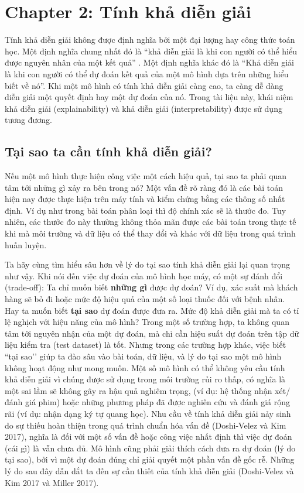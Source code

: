 \chapter*{Chapter 2: Tính khả diễn giải}
Tính khả diễn giải không được định nghĩa bởi một đại lượng hay công thức toán học. Một định nghĩa chung nhất đó là ``khả diễn giải là khi con người có thể hiểu được nguyên nhân của một kết quả'' . Một định nghĩa khác đó là ``Khả diễn giải là khi con người có thể dự đoán kết quả của một mô hình dựa trên những hiểu biết về nó''. Khi một mô hình có tính khả diễn giải càng cao, ta càng dễ dàng diễn giải một quyết định hay một dự đoán của nó. Trong tài liệu này, khái niệm khả diễn giải (explainability) và khả diễn giải (interpretability) được sử dụng tương đương.

\clearpage

\section{Tại sao ta cần tính khả diễn giải?}
Nếu một mô hình thực hiện công việc một cách hiệu quả, tại sao ta phải quan tâm tới những gì xảy ra bên trong nó? Một vấn đề rõ ràng đó là các bài toán hiện nay được thực hiện trên máy tính và kiểm chứng bằng các thông số nhất định. Ví dụ như trong bài toán phân loại thì độ chính xác sẽ là thước đo. Tuy nhiên, các thước đo này thường không thỏa mãn được các bài toán trong thực tế khi mà môi trường và dữ liệu có thể thay đổi và khác với dữ liệu trong quá trình huấn luyện.

Ta hãy cùng tìm hiểu sâu hơn về lý do tại sao tính khả diễn giải lại quan trọng như vậy. Khi nói đến việc dự đoán của mô hình học máy, có một sự đánh đổi (trade-off): Ta chỉ muốn biết \textbf{những gì} được dự đoán? Ví dụ, xác suất mà khách hàng sẽ bỏ đi hoặc mức độ hiệu quả của một số loại thuốc đối với bệnh nhân. Hay ta muốn biết \textbf{tại sao} dự đoán được đưa ra. Mức độ khả diễn giải mà ta có tỉ lệ nghịch với hiệu năng của mô hình? Trong một số trường hợp, ta không quan tâm tới nguyên nhận của một dự đoán, mà chỉ cần hiệu suất dự đoán trên tập dữ liệu kiểm tra (test dataset) là tốt. Nhưng trong các trường hợp khác, việc biết ``tại sao’’ giúp ta đào sâu vào bài toán, dữ liệu, và lý do tại sao một mô hình không hoạt động như mong muốn. Một số mô hình có thể không yêu cầu tính khả diễn giải vì chúng được sử dụng trong môi trường rủi ro thấp, có nghĩa là một sai lầm sẽ không gây ra hậu quả nghiêm trọng, (ví dụ: hệ thống nhận xét/ đánh giá phim) hoặc những phương pháp đã được nghiên cứu và đánh giá rộng rãi (ví dụ: nhận dạng ký tự quang học). Nhu cầu về tính khả diễn giải nảy sinh do sự thiếu hoàn thiện trong quá trình chuẩn hóa vấn đề (Doshi-Velez và Kim 2017), nghĩa là đối với một số vấn đề hoặc công việc nhất định thì việc dự đoán (cái gì) là vẫn chưa đủ. Mô hình cũng phải giải thích cách đưa ra dự đoán (lý do tại sao), bởi vì một dự đoán đúng chỉ giải quyết một phần vấn đề gốc rễ. Những lý do sau đây dẫn dắt ta đến sự cần thiết của tính khả diễn giải (Doshi-Velez và Kim 2017 và Miller 2017).

